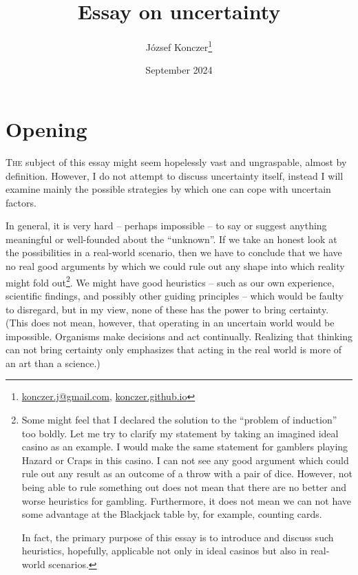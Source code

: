 \documentclass{article}
\title{{\bf Essay on uncertainty} \\ \pgfornament[height=0.8cm]{84}}
\author{József Konczer\footnote{
\href{mailto:konczer.j@gmail.com}{konczer.j@gmail.com},
\href{https://konczer.github.io/}{konczer.github.io}}
}
\date{September 2024}
\begin{document}
\maketitle

\section*{Opening}

\lettrine[lines=2]{T}{he} subject of this essay might seem hopelessly vast and ungraspable, almost by definition.
However, I do not attempt to discuss uncertainty itself, instead I will examine mainly the possible strategies by which one can cope with uncertain factors.

In general, it is very hard -- perhaps impossible -- to say or suggest anything meaningful or well-founded about the ``unknown''. If we take an honest look at the possibilities in a real-world scenario, then we have to conclude that we have no real good arguments by which we could rule out any shape into which reality might fold out\footnote{Some might feel that I declared the solution to the ``problem of induction'' \cite{sep:Induction} too boldly. Let me try to clarify my statement by taking an imagined ideal casino as an example. I would make the same statement for gamblers playing Hazard or Craps in this casino. I can not see any good argument which could rule out any result as an outcome of a throw with a pair of dice. However, not being able to rule something out does not mean that there are no better and worse heuristics for gambling. Furthermore, it does not mean we can not have some advantage at the Blackjack table by, for example, counting cards.

In fact, the primary purpose of this essay is to introduce and discuss such heuristics, hopefully, applicable not only in ideal casinos but also in real-world scenarios.
}.
We might have good heuristics -- such as our own experience, scientific findings, and possibly other guiding principles -- which would be faulty to disregard, but in my view, none of these has the power to bring certainty.
(This does not mean, however, that operating in an uncertain world would be impossible. Organisms make decisions and act continually. Realizing that thinking can not bring certainty only emphasizes that acting in the real world is more of an art than a science.)
\end{document}
